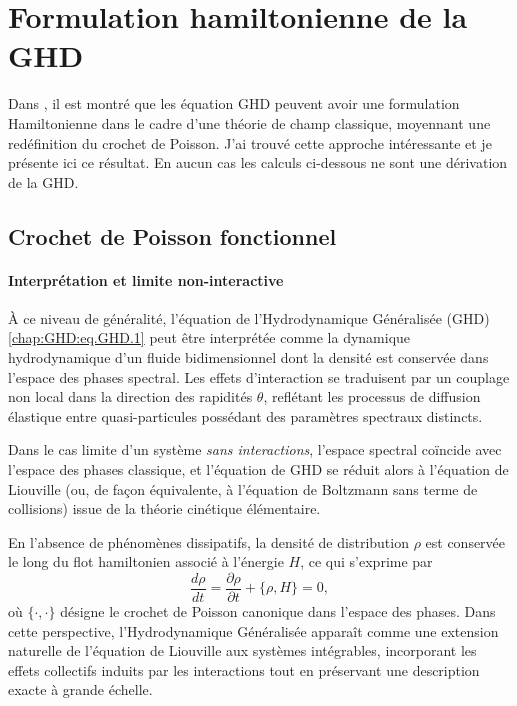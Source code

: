 \section{Formulation hamiltonienne de la GHD}
{\color{blue}
Dans  \cite{bonnemain2024hamiltonian}, il est montré que les équation GHD peuvent
avoir une formulation Hamiltonienne dans le cadre d'une théorie de champ classique,
moyennant une redéfinition du crochet de Poisson. J'ai trouvé cette approche intéressante
et je présente ici ce résultat. En aucun cas les calculs ci-dessous ne sont une dérivation de la GHD.}
\subsection{Crochet de Poisson fonctionnel}

\paragraph{Interprétation et limite non-interactive}  
À ce niveau de généralité, l'équation de l’Hydrodynamique Généralisée (GHD) \eqref{chap:GHD:eq.GHD.1} peut être interprétée comme la dynamique hydrodynamique d’un fluide bidimensionnel dont la densité est conservée dans l’espace des phases spectral.  
Les effets d’interaction se traduisent par un couplage non local dans la direction des rapidités $\theta$, reflétant les processus de diffusion élastique entre quasi-particules possédant des paramètres spectraux distincts.

\medskip

Dans le cas limite d’un système \emph{sans interactions}, l’espace spectral coïncide avec l’espace des phases classique, et l’équation de GHD se réduit alors à l’équation de Liouville (ou, de façon équivalente, à l’équation de Boltzmann sans terme de collisions) issue de la théorie cinétique élémentaire.

\medskip

En l’absence de phénomènes dissipatifs, la densité de distribution $\rho$ est conservée le long du flot hamiltonien associé à l’énergie $H$, ce qui s’exprime par
\begin{equation}\label{chap:GHD:eq.Liouv.1}
	\frac{d \rho}{dt} 
	= \frac{\partial \rho}{\partial t } + \{ \rho , H \} = 0,
\end{equation}
où $\{\cdot , \cdot\}$ désigne le crochet de Poisson canonique dans l’espace des phases.  
Dans cette perspective, l’Hydrodynamique Généralisée apparaît comme une extension naturelle de l’équation de Liouville aux systèmes intégrables, incorporant les effets collectifs induits par les interactions tout en préservant une description exacte à grande échelle.


